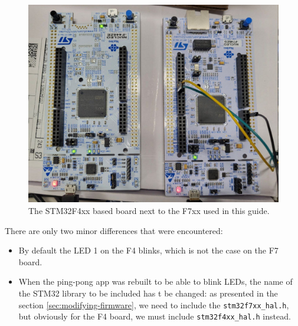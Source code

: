 \documentclass[10pt]{article}
\begin{document}
\begin{figure}[H]
  \centering
  \includegraphics[width=.8\textwidth]{./img/f4.jpg}
  \caption{The STM32F4xx based board next to the F7xx used in this guide.}
  \label{fig:f4}
\end{figure}

There are only two minor differences that were encountered:
\begin{itemize}
\item By default the LED 1 on the F4 blinks, which is not the case on the F7 board.
\item When the ping-pong app was rebuilt to be able to blink LEDs, the name of the STM32 library to be included has t be changed: as presented in the section \ref{sec:modifying-firmware}, we need to include the \verb|stm32f7xx_hal.h|, but obviously for the F4 board, we must include \verb|stm32f4xx_hal.h| instead.
\end{itemize}
\end{document}
